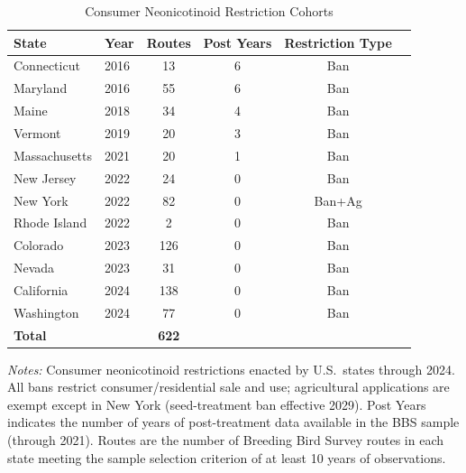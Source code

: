 \begin{table}[t]
\centering
\caption{Consumer Neonicotinoid Restriction Cohorts}
\label{tab:cohorts}
\begin{tabular}{llcccl}
\toprule
State & Year & Routes & Post Years & Restriction Type \\
\midrule
Connecticut & 2016 & 13 & 6 & Ban \\
Maryland & 2016 & 55 & 6 & Ban \\
Maine & 2018 & 34 & 4 & Ban \\
Vermont & 2019 & 20 & 3 & Ban \\
Massachusetts & 2021 & 20 & 1 & Ban \\
New Jersey & 2022 & 24 & 0 & Ban \\
New York & 2022 & 82 & 0 & Ban+Ag \\
Rhode Island & 2022 & 2 & 0 & Ban \\
Colorado & 2023 & 126 & 0 & Ban \\
Nevada & 2023 & 31 & 0 & Ban \\
California & 2024 & 138 & 0 & Ban \\
Washington & 2024 & 77 & 0 & Ban \\
\midrule
\textbf{Total} & & \textbf{622} & & \\
\bottomrule
\end{tabular}
\begin{tablenotes}[flushleft]
\item \textit{Notes:} Consumer neonicotinoid restrictions enacted by U.S.\ states through 2024. All bans restrict consumer/residential sale and use; agricultural applications are exempt except in New York (seed-treatment ban effective 2029). Post Years indicates the number of years of post-treatment data available in the BBS sample (through 2021). Routes are the number of Breeding Bird Survey routes in each state meeting the sample selection criterion of at least 10 years of observations.
\end{tablenotes}
\end{table}
